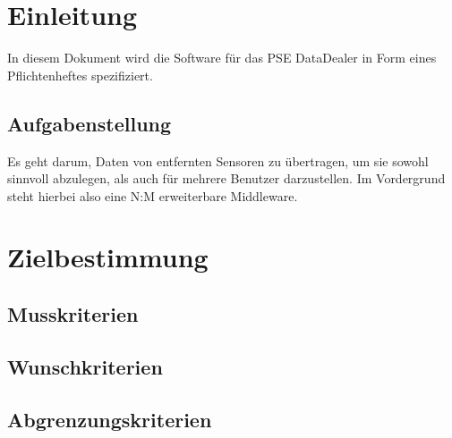 \documentclass[pflichtenheft.tex]{subfiles}
\begin{document}
\chapter{Einleitung}

In diesem Dokument wird die Software für das PSE DataDealer in Form eines Pflichtenheftes 
spezifiziert.

\section{Aufgabenstellung}

Es geht darum, Daten von entfernten Sensoren zu übertragen, um sie sowohl 
sinnvoll abzulegen, als auch für mehrere Benutzer darzustellen. Im Vordergrund steht hierbei
also eine N:M erweiterbare Middleware.

\chapter{Zielbestimmung}

\section{Musskriterien}

\section{Wunschkriterien}

\section{Abgrenzungskriterien}
\end{document}
